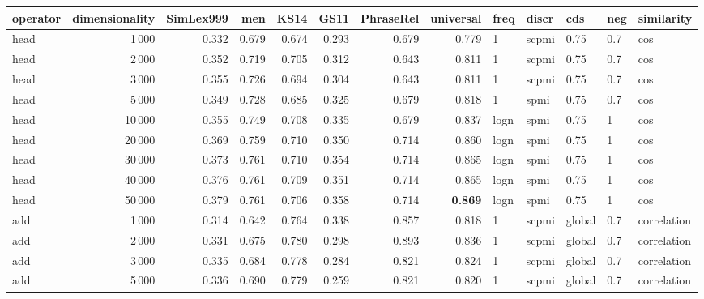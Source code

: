 \begin{tabular}{lrrrrrrrlllll}
\toprule
operator &  dimensionality &  SimLex999 &    men &   KS14 &   GS11 &  PhraseRel &  universal &  freq &  discr &     cds &  neg &     similarity \\
\midrule
    head &            1\,000 &      0.332 &  0.679 &  0.674 &  0.293 &      0.679 &      0.779 &     1 &  scpmi &    0.75 &  0.7 &            cos \\
    head &            2\,000 &      0.352 &  0.719 &  0.705 &  0.312 &      0.643 &      0.811 &     1 &  scpmi &    0.75 &  0.7 &            cos \\
    head &            3\,000 &      0.355 &  0.726 &  0.694 &  0.304 &      0.643 &      0.811 &     1 &  scpmi &    0.75 &  0.7 &            cos \\
    head &            5\,000 &      0.349 &  0.728 &  0.685 &  0.325 &      0.679 &      0.818 &     1 &   spmi &    0.75 &  0.7 &            cos \\
    head &           10\,000 &      0.355 &  0.749 &  0.708 &  0.335 &      0.679 &      0.837 &  logn &   spmi &    0.75 &    1 &            cos \\
    head &           20\,000 &      0.369 &  0.759 &  0.710 &  0.350 &      0.714 &      0.860 &  logn &   spmi &    0.75 &    1 &            cos \\
    head &           30\,000 &      0.373 &  0.761 &  0.710 &  0.354 &      0.714 &      0.865 &  logn &   spmi &    0.75 &    1 &            cos \\
    head &           40\,000 &      0.376 &  0.761 &  0.709 &  0.351 &      0.714 &      0.865 &  logn &   spmi &    0.75 &    1 &            cos \\
    head &           50\,000 &      0.379 &  0.761 &  0.706 &  0.358 &      0.714 &      \textbf{0.869} &  logn &   spmi &    0.75 &    1 &            cos \\ \addlinespace
     add &            1\,000 &      0.314 &  0.642 &  0.764 &  0.338 &      0.857 &      0.818 &     1 &  scpmi &  global &  0.7 &    correlation \\
     add &            2\,000 &      0.331 &  0.675 &  0.780 &  0.298 &      0.893 &      0.836 &     1 &  scpmi &  global &  0.7 &    correlation \\
     add &            3\,000 &      0.335 &  0.684 &  0.778 &  0.284 &      0.821 &      0.824 &     1 &  scpmi &  global &  0.7 &    correlation \\
     add &            5\,000 &      0.336 &  0.690 &  0.779 &  0.259 &      0.821 &      0.820 &     1 &  scpmi &  global &  0.7 &    correlation \\

\end{tabular}
